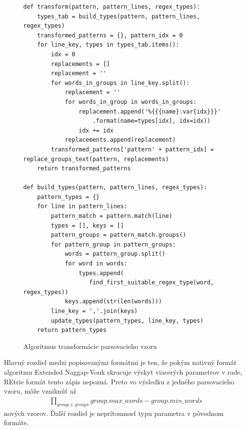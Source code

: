 \begin{figure}[htbp]
\centering
\begin{minipage}{0.9\textwidth}
\lstset{columns=flexible,breaklines=true,breakatwhitespace=true, showstringspaces=false}
\begin{lstlisting}
def transform(pattern, pattern_lines, regex_types):
    types_tab = build_types(pattern, pattern_lines, regex_types)
    transformed_patterns = {}, pattern_idx = 0
    for line_key, types in types_tab.items():
        idx = 0
        replacements = []
        replacement = ''
        for words_in_groups in line_key.split():
            replacement = ''
            for words_in_group in words_in_groups:
                replacement.append('%{{{name}:var{idx}}}'
                    .format(name=types[idx], idx=idx))
                idx += idx
            replacements.append(replacement)   
        transformed_patterns['pattern' + pattern_idx] = replace_groups_text(pattern, replacements)
    return transformed_patterns

def build_types(pattern, pattern_lines, regex_types):
    pattern_types = {}
    for line in pattern_lines:
        pattern_match = pattern.match(line)
        types = [], keys = []
        pattern_groups = pattern_match.groups()
        for pattern_group in pattern_groups:
            words = pattern_group.split()
            for word in words:
                types.append(
                   find_first_suitable_regex_type(word, regex_types))
            keys.append(str(len(words)))
        line_key = ','.join(keys)
        update_types(pattern_types, line_key, types)
    return pattern_types
\end{lstlisting} 		
\end{minipage} 
\caption{Algoritmus transformácie parsovacieho vzoru}
\label{fig:pattern-transformation}
\end{figure}

Hlavný rozdiel medzi popisovanými formátmi je ten, že pokým nativný formát algoritmu Extended Naggap-Vouk skracuje výskyt viacerých parametrov v rade, REtrie formát tento zápis nepozná. Preto vo výsledku z jedného parsovacieho vzoru, môže vzniknúť až 
\begin{align*}
\prod_{group \in groups} group.max\_words - group.min\_words
\end{align*}
nových vzorov. Ďalší rozdiel je neprítomnosť typu parametra v pôvodnom formáte.
